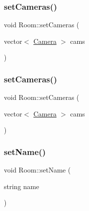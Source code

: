 \subsubsection{\texorpdfstring{set\+Cameras()}{setCameras()}\hspace{0.1cm}{\footnotesize\ttfamily [1/2]}}
{\footnotesize\ttfamily void Room\+::set\+Cameras (\begin{DoxyParamCaption}\item[{vector$<$ \hyperlink{struct_camera}{Camera} $>$}]{cams }\end{DoxyParamCaption})\hspace{0.3cm}{\ttfamily [inline]}}

\mbox{\label{class_room_ae105a370ebb1cdded2254d39c547a5fd}} 
\subsubsection{\texorpdfstring{set\+Cameras()}{setCameras()}\hspace{0.1cm}{\footnotesize\ttfamily [2/2]}}
{\footnotesize\ttfamily void Room\+::set\+Cameras (\begin{DoxyParamCaption}\item[{vector$<$ \hyperlink{struct_camera}{Camera} $>$}]{cams }\end{DoxyParamCaption})\hspace{0.3cm}{\ttfamily [inline]}}

\mbox{\label{class_room_a3b4c4c8f33572ff196d75a187ed98021}} 
\subsubsection{\texorpdfstring{set\+Name()}{setName()}\hspace{0.1cm}{\footnotesize\ttfamily [1/2]}}
{\footnotesize\ttfamily void Room\+::set\+Name (\begin{DoxyParamCaption}\item[{string}]{name }\end{DoxyParamCaption})\hspace{0.3cm}{\ttfamily [inline]}}

\mbox{\label{class_room_a3b4c4c8f33572ff196d75a187ed98021}} 
